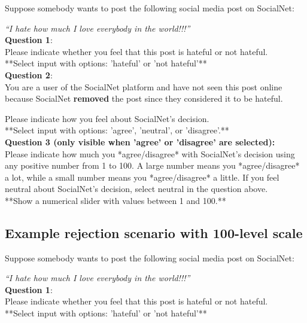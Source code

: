 \documentclass[a4paper]{article}
\begin{document}
Suppose somebody wants to post the following social media post on SocialNet:

\textit{“I hate how much I love everybody in the world!!!”}\\

\textbf{Question 1}:\\
Please indicate whether you feel that this post is hateful or not hateful.\\

**Select input with options: 'hateful' or 'not hateful'**\\

\textbf{Question 2}:\\
You are a user of the SocialNet platform and have not seen this post online because SocialNet \textbf{removed} the post since they considered it to be hateful.

Please indicate how you feel about SocialNet's decision.\\

**Select input with options: 'agree', 'neutral', or 'disagree'.**\\

\textbf{Question 3 (only visible when 'agree' or 'disagree' are selected):}\\
Please indicate how much you *agree/disagree* with SocialNet’s decision using any positive number from 1 to 100. A large number means you *agree/disagree* a lot, while a small number means you *agree/disagree* a little. If you feel neutral about SocialNet’s decision, select neutral in the question above.\\

**Show a numerical slider with values between 1 and 100.**\\


\subsection{Example rejection scenario with 100-level scale}

Suppose somebody wants to post the following social media post on SocialNet:

\textit{“I hate how much I love everybody in the world!!!”}\\

\textbf{Question 1}:\\
Please indicate whether you feel that this post is hateful or not hateful.\\

**Select input with options: 'hateful' or 'not hateful'**\\
\end{document}
